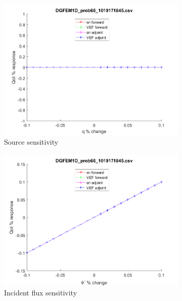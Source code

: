 \documentclass{article}
\begin{document}
\begin{figure}[H]
\label{Case66Sens}
\centering
\begin{subfigure}{.5\textwidth}
  \centering
  \includegraphics[width=.98\linewidth]{IanProposal/figures2/66qSens.png}
  \caption{Source sensitivity}
  \label{fig:sfig1}
\end{subfigure}%
\begin{subfigure}{.5\textwidth}
  \centering
  \includegraphics[width=.98\linewidth]{IanProposal/figures2/66incSens.png}
  \caption{Incident flux sensitivity}
  \label{fig:sfig4}
\end{subfigure}%
\\
\begin{subfigure}{.5\textwidth}
  \centering

\end{subfigure}
\end{figure}
\end{document}
